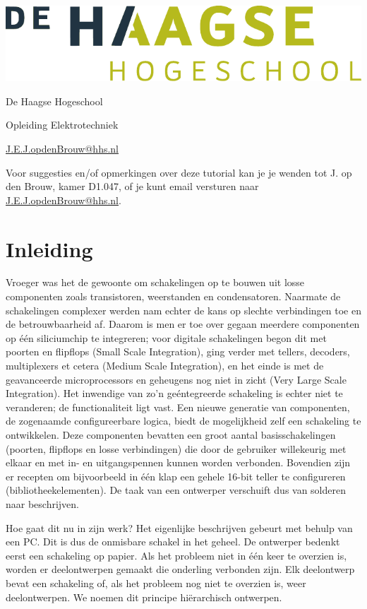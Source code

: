 \documentclass[a4paper,12pt,fleqn,twoside]{book}
\author{\tutauthor}
\title{\tuttitle}
\date{\today}
\makeatletter
\let\cleardoublepage\clearpage
\newcommand\emailaddress{\href{mailto:J.E.J.opdenBrouw@hhs.nl}{\sffamily J.E.J.opdenBrouw@hhs.nl}}
\def\maketitle{%
  \null
  \thispagestyle{empty}%
  \vfill
  \begin{center}\leavevmode
    {\fontfamily{phv}\fontsize{35pt}{60pt}\selectfont\bfseries\scshape \@title\par}%
    \vskip 8.0cm
    \begin{minipage}[c]{.50\linewidth}
       \includegraphics[width=\linewidth]{HHS_grijs_groen_fc}
    \end{minipage}\hfill
    \begin{minipage}[c]{0.40\linewidth}
       {\hfill \large \@author\par}%
       \vskip 0.03cm
       {\hfill \large De Haagse Hogeschool\par}%
       \vskip 0.03cm
       {\hfill \large Opleiding Elektrotechniek\par}%
       \vskip 0.03cm
       {\hfill \large \@date\par}%
       \vskip 0.03cm
       {\hfill \large \emailaddress\par}%
  \end{minipage}
  \end{center}%
  \vfill
  \null
  }
\makeatother
\begin{document}
\raggedbottom

\maketitle

\tableofcontents
\vfill

Voor suggesties en/of opmerkingen over deze tutorial kan je je wenden tot
J. op den Brouw, kamer D1.047, of je kunt email versturen naar \emailaddress.


\newpage
\listoffigures
\begingroup
\let\cleardoublepage\relax
\listoftables
\lstlistoflistings
\endgroup



\chapter{Inleiding}
\label{chap:inleiding}
Vroeger was het de gewoonte om schakelingen op te bouwen uit losse componenten
zoals transistoren, weerstanden en condensatoren. Naarmate de schakelingen
complexer werden nam echter de kans op slechte verbindingen toe en de
betrouwbaarheid af. Daarom is men er toe over gegaan meerdere componenten op
\'{e}\'{e}n siliciumchip te integreren; voor digitale schakelingen begon dit
met poorten en flipflops (Small Scale Integration), ging verder  met tellers,
decoders, multiplexers et cetera (Medium Scale Integration), en het einde is
met de geavanceerde microprocessors en geheugens nog niet in zicht (Very Large
Scale Integration). Het inwendige van zo'n ge\'{e}ntegreerde schakeling is
echter niet te veranderen; de functionaliteit ligt vast. Een nieuwe generatie
van componenten, de zogenaamde configureerbare logica, biedt de mogelijkheid
zelf een schakeling te ontwikkelen. Deze componenten bevatten een groot aantal
basisschakelingen (poorten, flipflops en losse verbindingen) die door de
gebruiker willekeurig met elkaar en met in- en uitgangspennen kunnen worden
verbonden. Bovendien zijn er recepten om bijvoorbeeld in \'{e}\'{e}n klap een
gehele 16-bit teller te configureren (bibliotheekelementen). De taak van een
ontwerper verschuift dus van solderen naar beschrijven.

Hoe gaat dit nu in zijn werk? Het eigenlijke beschrijven gebeurt met behulp van
een PC. Dit is dus de onmisbare schakel in het geheel. De ontwerper bedenkt
eerst een schakeling op papier. Als het probleem niet in \'{e}\'{e}n keer te
overzien  is, worden er deelontwerpen gemaakt die onderling verbonden zijn. Elk
deelontwerp bevat een schakeling of, als het probleem nog niet te overzien 
is, weer deelontwerpen. We noemen dit principe hi\"{e}rarchisch ontwerpen.
\end{document}
